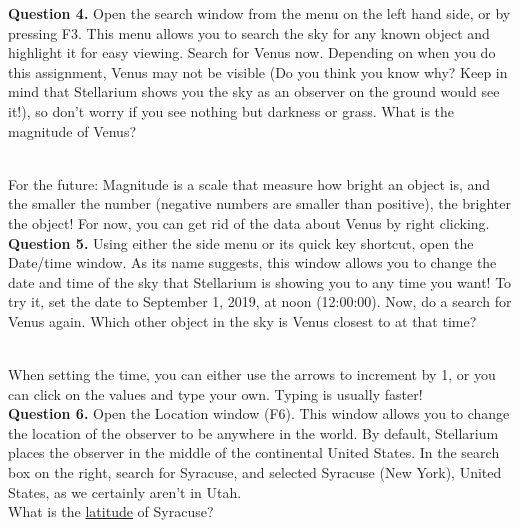 \documentclass[11pt]{article}
\begin{document}
\newpage

\textbf{Question 4.} Open the search window from the menu on the left hand side, or by pressing F3. This menu allows you to search the sky for any known object and highlight it for easy viewing. Search for Venus now. Depending on when you do this assignment, Venus may not be visible (Do you think you know why? Keep in mind that Stellarium shows you the sky as an observer on the ground would see it!), so don't worry if you see nothing but darkness or grass. What is the magnitude of Venus?\\
\vspace*{1.5cm}

\hrulefill\\
For the future: Magnitude is a scale that measure how bright an object is, and the smaller the number (negative numbers are smaller than positive), the brighter the object! For now, you can get rid of the data about Venus by right clicking.\\

\textbf{Question 5.} Using either the side menu or its quick key shortcut, open the Date/time window. As its name suggests, this window allows you to change the date and time of the sky that Stellarium is showing you to any time you want! To try it, set the date to September 1, 2019, at noon (12:00:00). Now, do a search for Venus again. Which other object in the sky is Venus closest to at that time?\\
\vspace*{1.5cm}

\hrulefill\\
When setting the time, you can either use the arrows to increment by 1, or you can click on the values and type your own. Typing is usually faster!\\

\textbf{Question 6.} Open the Location window (F6). This window allows you to change the location of the observer to be anywhere in the world. By default, Stellarium places the observer in the middle of the continental United States. In the search box on the right, search for Syracuse, and selected Syracuse (New York), United States, as we certainly aren't in Utah.\\

What is the \underline{latitude} of Syracuse?\\
\vspace*{1.5cm}

\hrulefill\\
\end{document}
